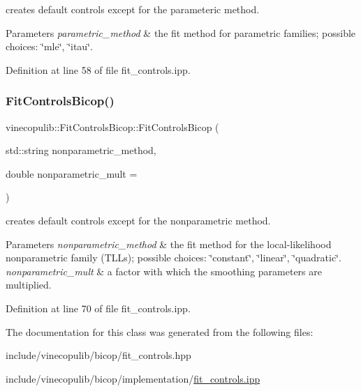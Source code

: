 creates default controls except for the parameteric method. 


\begin{DoxyParams}{Parameters}
{\em parametric\+\_\+method} & the fit method for parametric families; possible choices\+: {\ttfamily \char`\"{}mle\char`\"{}}, {\ttfamily \char`\"{}itau\char`\"{}}. \\
\hline
\end{DoxyParams}


Definition at line 58 of file fit\+\_\+controls.\+ipp.

\mbox{\label{classvinecopulib_1_1_fit_controls_bicop_ae87a80323e8f5d3702ab0db42bf8bcb5}} 
\subsubsection{\texorpdfstring{Fit\+Controls\+Bicop()}{FitControlsBicop()}\hspace{0.1cm}{\footnotesize\ttfamily [3/3]}}
{\footnotesize\ttfamily vinecopulib\+::\+Fit\+Controls\+Bicop\+::\+Fit\+Controls\+Bicop (\begin{DoxyParamCaption}\item[{std\+::string}]{nonparametric\+\_\+method,  }\item[{double}]{nonparametric\+\_\+mult = {} }\end{DoxyParamCaption})\hspace{0.3cm}{\ttfamily [inline]}}



creates default controls except for the nonparametric method. 


\begin{DoxyParams}{Parameters}
{\em nonparametric\+\_\+method} & the fit method for the local-\/likelihood nonparametric family (T\+L\+Ls); possible choices\+: {\ttfamily \char`\"{}constant\char`\"{}}, {\ttfamily \char`\"{}linear\char`\"{}}, {\ttfamily \char`\"{}quadratic\char`\"{}}. \\
\hline
{\em nonparametric\+\_\+mult} & a factor with which the smoothing parameters are multiplied. \\
\hline
\end{DoxyParams}


Definition at line 70 of file fit\+\_\+controls.\+ipp.



The documentation for this class was generated from the following files\+:\begin{DoxyCompactItemize}
\item 
include/vinecopulib/bicop/fit\+\_\+controls.\+hpp\item 
include/vinecopulib/bicop/implementation/\hyperlink{bicop_2implementation_2fit__controls_8ipp}{fit\+\_\+controls.\+ipp}\end{DoxyCompactItemize}
